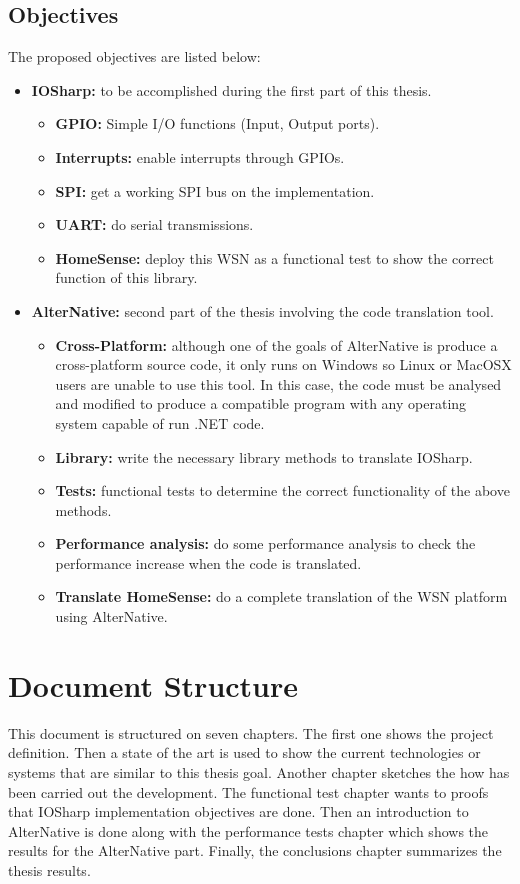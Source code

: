\subsection{Objectives}\label{SS:Proposal-Objectives}
The proposed objectives are listed below:  
\begin{itemize}
	\item \textbf{IOSharp:} to be accomplished during the first part of this thesis.
		\begin{itemize}
		\item \textbf{GPIO:} Simple I/O functions (Input, Output ports).
		\item \textbf{Interrupts:} enable interrupts through GPIOs.
		\item \textbf{SPI:} get a working SPI bus on the implementation.
		\item \textbf{UART:} do serial transmissions.
		\item \textbf{HomeSense:} deploy this WSN as a functional test to show the correct function of this library.
		\end{itemize}
	\item \textbf{AlterNative:} second part of the thesis involving the code translation tool.
		\begin{itemize}
		\item \textbf{Cross-Platform:} although one of the goals of AlterNative is produce a cross-platform source code, it only runs on Windows so Linux or MacOSX users are unable to use this tool. In this case, the code must be analysed and modified to produce a compatible program with any operating system capable of run .NET code.
		\item \textbf{Library:} write the necessary library methods to translate IOSharp.
		\item \textbf{Tests:} functional tests to determine the correct functionality of the above methods.
		\item \textbf{Performance analysis:} do some performance analysis to check the performance increase when the code is translated.
		\item \textbf{Translate HomeSense:} do a complete translation of the WSN platform using AlterNative.
		\end{itemize}
\end{itemize}


\section{Document Structure}\label{SS:Proposal-Doc-Structure}
This document is structured on seven chapters. The first one shows the project definition. Then a state of the art is used to show the current technologies or systems that are similar to this thesis goal. Another chapter sketches the how has been carried out the development. The functional test chapter wants to proofs that IOSharp implementation objectives are done. Then an introduction to AlterNative is done along with the performance tests chapter which shows the results for the AlterNative part. Finally, the conclusions chapter summarizes the thesis results.